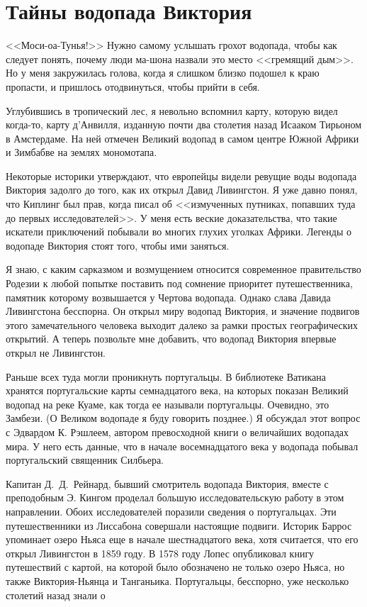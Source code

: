 \documentclass[12pt,a4paper,twoside,openany,svgnames]{memoir}
\begin{document}
\chapter{Тайны водопада Виктория}

<<Моси-оа-Тунья!>> Нужно самому услышать грохот водопада, чтобы как следует понять, почему люди ма-шона назвали это место <<гремящий дым>>. Но у меня закружилась голова, когда я слишком близко подошел к краю пропасти, и пришлось отодвинуться, чтобы прийти в себя.

Углубившись в тропический лес, я невольно вспомнил карту, которую видел когда-то, карту д'Анвилля, изданную почти два столетия назад Исааком Тирьоном в Амстердаме. На ней отмечен Великий водопад в самом центре Южной Африки и Зимбабве на землях мономотапа.

Некоторые историки утверждают, что европейцы видели ревущие воды водопада Виктория задолго до того, как их открыл Давид Ливингстон. Я уже давно понял, что Киплинг был прав, когда писал об <<измученных путниках, попавших туда до первых исследователей>>. У меня есть веские доказательства, что такие искатели приключений побывали во многих глухих уголках Африки. Легенды о водопаде Виктория стоят того, чтобы ими заняться.

Я знаю, с каким сарказмом и возмущением относится современное правительство Родезии к любой попытке поставить под сомнение приоритет путешественника, памятник которому возвышается у Чертова водопада. Однако слава Давида Ливингстона бесспорна. Он открыл миру водопад Виктория, и значение подвигов этого замечательного человека выходит далеко за рамки простых географических открытий. А теперь позвольте мне добавить, что водопад Виктория впервые открыл не Ливингстон.

Раньше всех туда могли проникнуть португальцы. В библиотеке Ватикана хранятся португальские карты семнадцатого века, на которых показан Великий водопад на реке Куаме, как тогда ее называли португальцы. Очевидно, это Замбези. (О Великом водопаде я буду говорить позднее.) Я обсуждал этот вопрос с Эдвардом К. Рэшлеем, автором превосходной книги о величайших водопадах мира. У него есть данные, что в начале восемнадцатого века у водопада побывал португальский священник Силбьера.

Капитан Д.~Д.~Рейнард, бывший смотритель водопада Виктория, вместе с преподобным Э. Кингом проделал большую исследовательскую работу в этом направлении. Обоих исследователей поразили сведения о португальцах. Эти путешественники из Лиссабона совершали настоящие подвиги. Историк Баррос упоминает озеро Ньяса еще в начале шестнадцатого века, хотя считается, что его открыл Ливингстон в 1859 году. В 1578 году Лопес опубликовал книгу путешествий с картой, на которой было обозначено не только озеро Ньяса, но также Виктория-Ньянца и Танганьика. Португальцы, бесспорно, уже несколько столетий назад знали о
\end{document}
